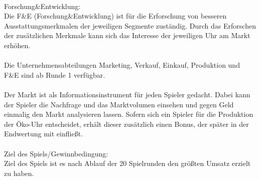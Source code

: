 \\
Forschung\&Entwicklung:\\
Die F\&E (Forschung\&Entwicklung) ist für die Erforschung von besseren Ausstattungsmerkmalen der jeweiligen Segmente zuständig. Durch das Erforschen der zusätzlichen Merkmale kann sich das Interesse der jeweiligen Uhr am Markt erhöhen.\\
\\
Die Unternehmensabteilungen Marketing, Verkauf, Einkauf, Produktion und F\&E sind ab Runde 1 verfügbar.\\
\\
Der Markt ist als Informationsinstrument für jeden Spieler gedacht. Dabei kann der Spieler die Nachfrage und das Marktvolumen einsehen und gegen Geld einmalig den Markt analysieren lassen. Sofern sich ein Spieler für die Produktion der Öko-Uhr entscheidet, erhält dieser zusätzlich einen Bonus, der später in der Endwertung mit einfließt.\\ 
\\
Ziel des Spiels/Gewinnbedingung:\\
Ziel des Spiels ist es nach Ablauf der 20 Spielrunden den größten Umsatz erzielt zu haben.


